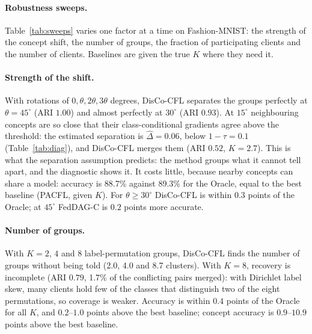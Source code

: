 \paragraph{Robustness sweeps.}\label{sec:sweeps}
Table~\ref{tab:sweeps} varies one factor at a time on Fashion-MNIST: the strength of the concept shift, the number of groups, the fraction of participating clients and the number of clients. Baselines are given the true $K$ where they need it.

\begin{table}[!htbp]
\centering
\caption{Robustness sweeps (Fashion-MNIST, 3 seeds; the $90^\circ$ row repeats the \emph{Rotation} scenario with 5 seeds). For DisCo-CFL: ARI, number of clusters, conflict-merge rate, accuracy and concept accuracy. For comparison: the best baseline on accuracy and on concept accuracy (in parentheses), and the Oracle's accuracy.}\label{tab:sweeps}

\end{table}

\paragraph{Strength of the shift.} With rotations of $0,\theta,2\theta,3\theta$ degrees, DisCo-CFL separates the groups perfectly at $\theta=45^\circ$ (ARI $1.00$) and almost perfectly at $30^\circ$ (ARI $0.93$). At $15^\circ$ neighbouring concepts are so close that their class-conditional gradients agree above the threshold: the estimated separation is $\hat\Delta=0.06$, below $1-\tau=0.1$ (Table~\ref{tab:diag}), and DisCo-CFL merges them (ARI $0.52$, $K=2.7$). This is what the separation assumption predicts: the method groups what it cannot tell apart, and the diagnostic shows it. It costs little, because nearby concepts can share a model: accuracy is 88.7\% against 89.3\% for the Oracle, equal to the best baseline (PACFL, given $K$). For $\theta\ge30^\circ$ DisCo-CFL is within $0.3$ points of the Oracle; at $45^\circ$ FedDAG-C is $0.2$ points more accurate.

\paragraph{Number of groups.} With $K=2$, $4$ and $8$ label-permutation groups, DisCo-CFL finds the number of groups without being told (2.0, 4.0 and 8.7 clusters). With $K=8$, recovery is incomplete (ARI $0.79$, 1.7\% of the conflicting pairs merged): with Dirichlet label skew, many clients hold few of the classes that distinguish two of the eight permutations, so coverage is weaker. Accuracy is within $0.4$ points of the Oracle for all $K$, and $0.2$--$1.0$ points above the best baseline; concept accuracy is $0.9$--$10.9$ points above the best baseline.

